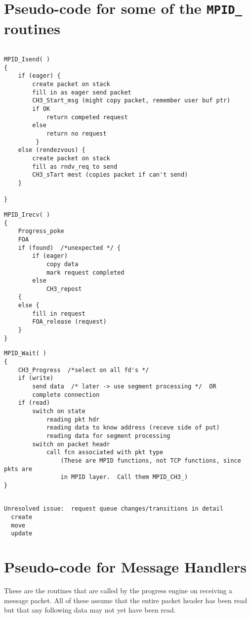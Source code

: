 \documentclass{article}
\def\code#1{\texttt{#1}}
\begin{document}
\section{Pseudo-code for some of the \code{MPID_} routines}

\begin{verbatim}

MPID_Isend( )
{
    if (eager) {
        create packet on stack
        fill in as eager send packet
        CH3_Start_msg (might copy packet, remember user buf ptr)
        if OK
            return competed request
        else        
            return no request 
         }
    else (rendezvous) {
        create packet on stack
        fill as rndv_req to send
        CH3_sTart mest (copies packet if can't send)
    } 

}
\end{verbatim}

\begin{verbatim}
MPID_Irecv( )
{
    Progress_poke
    FOA
    if (found)  /*unexpected */ {
        if (eager)
            copy data
            mark request completed
        else
            CH3_repost
    {
    else {
        fill in request
        FOA_release (request)
    }
}
\end{verbatim}

\begin{verbatim}
MPID_Wait( )
{
    CH3_Progress  /*select on all fd's */
    if (write)
        send data  /* later -> use segment processing */  OR
        complete connection
    if (read)
        switch on state
            reading pkt hdr
            reading data to know address (receve side of put)
            reading data for segment processing
        switch on packet headr
            call fcn associated with pkt type
                (These are MPID functions, not TCP functions, since pkts are
                in MPID layer.  Call them MPID_CH3_) 
}
\end{verbatim}

\begin{verbatim}

Unresolved issue:  request queue changes/transitions in detail
  create
  move
  update
\end{verbatim}


\section{Pseudo-code for Message Handlers}
These are the routines that are called by the progress engine on receiving a
message packet.  All of these assume that the entire packet header has been 
read but that any following data may not yet have been read.
\end{document}

